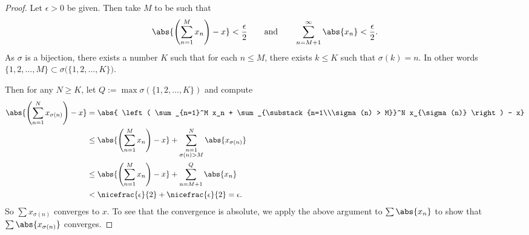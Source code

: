 \documentclass[12pt]{book}
\begin{document}
\begin{proof}
Let $\epsilon > 0$ be given.
Then take $M$ to be such that
\begin{equation*}
\abs{\left(\sum_{n=1}^M x_n \right) - x} < \frac{\epsilon}{2}
\qquad \text{and} \qquad
\sum_{n=M+1}^\infty \abs{x_n} < \frac{\epsilon}{2} .
\end{equation*}
As $\sigma$ is a bijection,
there exists a number $K$ such that for each
$n \leq M$, there exists $k \leq K$ such that $\sigma(k) = n$.
In other words
$\{ 1,2,\ldots,M \} \subset \sigma\bigl(\{ 1,2,\ldots,K \} \bigr)$.

Then for any $N \geq K$, let $Q := \max \sigma(\{ 1,2,\ldots,K \})$
and compute
\begin{equation*}
\begin{split}
\abs{\left( \sum_{n=1}^N x_{\sigma(n)} \right) - x}
& =
\abs{ \left( \sum_{n=1}^M x_n
+
\sum_{\substack{n=1\\\sigma(n) > M}}^N x_{\sigma(n)} \right) - x}
\\
& \leq
\abs{ \left( \sum_{n=1}^M x_n \right) - x}
+
\sum_{\substack{n=1\\\sigma(n) > M}}^N \abs{x_{\sigma(n)}}
\\
& \leq
\abs{ \left( \sum_{n=1}^M x_n \right) - x}
+
\sum_{n=M+1}^Q \abs{x_{n}}
\\
& < \nicefrac{\epsilon}{2} + \nicefrac{\epsilon}{2} = \epsilon .
\end{split}
\end{equation*}
So 
$\sum x_{\sigma(n)}$ converges to $x$.
To see that the convergence
is absolute, we apply the above argument to $\sum \abs{x_n}$ to show
that $\sum \abs{x_{\sigma(n)}}$ converges.
\end{proof}
\end{document}
